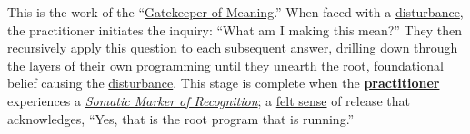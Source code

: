 \documentclass{article}
\begin{document}
\begin{nobullet}
\begin{enumerate}[label={}]
        This is the work of the ``\hyperlink{gloss:gatekeeper_of_meaning}{Gatekeeper of Meaning}.'' When faced with a \hyperlink{gloss:disturbance}{disturbance}, the practitioner initiates the inquiry: ``What am I making this mean?'' They then recursively apply this question to each subsequent answer, drilling down through the layers of their own programming until they unearth the root, foundational belief causing the \hyperlink{gloss:disturbance}{disturbance}. This stage is complete when the \textbf{\underline{practitioner}} experiences a \textit{\hyperlink{gloss:somatic_marker_of_recognition}{Somatic Marker of Recognition}}; a \hyperlink{gloss:felt_sense}{felt sense} of release that acknowledges, ``Yes, that is the root program that is running.''
        

\end{enumerate}
\end{nobullet}
\end{document}
